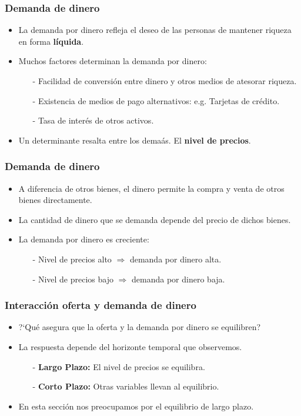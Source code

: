 \documentclass{beamer}
\begin{document}
\begin{frame}
\frametitle{Demanda de dinero}
\begin{itemize}
\setlength\itemsep{1.4em}
\item La demanda por dinero refleja el deseo de las personas de mantener riqueza en forma \textbf{l\'iquida}.
\item Muchos factores determinan la demanda por dinero:\\
\begin{itemize}
\setlength\itemsep{0.6em}
\item[-] Facilidad de conversi\'on entre dinero y otros medios de atesorar riqueza.
\item[-] Existencia de medios de pago alternativos: e.g. Tarjetas de cr\'edito.
\item[-] Tasa de inter\'es de otros activos.
\end{itemize}
\item Un determinante resalta entre los dema\'as. El \textbf{nivel de precios}.
\end{itemize}
\end{frame}

\begin{frame}
\frametitle{Demanda de dinero}
\begin{itemize}
\setlength\itemsep{1.4em}
\item A diferencia de otros bienes, el dinero permite la compra y venta de otros bienes directamente.
\item La cantidad de dinero que se demanda depende del precio de dichos bienes.
\item La demanda por dinero es creciente:\\
\begin{itemize}
\setlength\itemsep{0.8em}
\item[-] Nivel de precios alto $\Rightarrow$ demanda por dinero alta.
\item[-] Nivel de precios bajo $\Rightarrow$ demanda por dinero baja.
\end{itemize}
\end{itemize}
\end{frame}

\begin{frame}
\frametitle{Interacci\'on oferta y demanda de dinero}
\begin{itemize}
\setlength\itemsep{1.4em}
\item ?`Qu\'e asegura que la oferta y la demanda por dinero se equilibren?
\item La respuesta depende del horizonte temporal que observemos.\\
\begin{itemize}
\setlength\itemsep{0.8em}
\item[-] \textbf{Largo Plazo:} El nivel de precios se equilibra.
\item[-] \textbf{Corto Plazo:} Otras variables llevan al equilibrio.
\end{itemize}
\item En esta secci\'on nos preocupamos por el equilibrio de largo plazo.
\end{itemize}
\end{frame}
\end{document}
